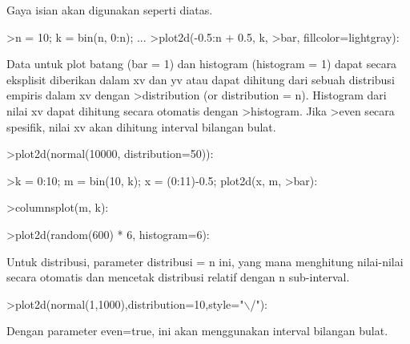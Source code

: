 \documentclass[a4paper,10pt]{article}
\begin{document}
\begin{eulernotebook}
\begin{eulercomment}
\begin{eulercomment}
\begin{eulercomment}
\begin{eulercomment}
\begin{eulercomment}
Gaya isian akan digunakan seperti diatas.
\end{eulercomment}
\begin{eulerprompt}
>n = 10; k = bin(n, 0:n); ...
>plot2d(-0.5:n + 0.5, k, >bar, fillcolor=lightgray):
\end{eulerprompt}
\begin{eulercomment}
Data untuk plot batang (bar = 1) dan histogram (histogram = 1) dapat
secara eksplisit diberikan dalam xv dan yv atau dapat dihitung dari
sebuah distribusi empiris dalam xv dengan \textgreater{}distribution (or
distribution = n). Histogram dari nilai xv dapat dihitung secara
otomatis dengan \textgreater{}histogram. Jika \textgreater{}even secara spesifik, nilai xv akan
dihitung interval bilangan bulat.
\end{eulercomment}
\begin{eulerprompt}
>plot2d(normal(10000, distribution=50)):
\end{eulerprompt}
\begin{eulerprompt}
>k = 0:10; m = bin(10, k); x = (0:11)-0.5; plot2d(x, m, >bar):
\end{eulerprompt}
\begin{eulerprompt}
>columnsplot(m, k):
\end{eulerprompt}
\begin{eulerprompt}
>plot2d(random(600) * 6, histogram=6):
\end{eulerprompt}
\begin{eulercomment}
Untuk distribusi, parameter distribusi = n ini, yang mana menghitung
nilai-nilai secara otomatis dan mencetak distribusi relatif dengan n
sub-interval.
\end{eulercomment}
\begin{eulerprompt}
>plot2d(normal(1,1000),distribution=10,style="\(\backslash\)/"):
\end{eulerprompt}
\begin{eulercomment}
Dengan parameter even=true, ini akan menggunakan interval bilangan
bulat.
\end{eulercomment}
\begin{eulerprompt}

\end{eulerprompt}
\end{eulercomment}
\end{eulercomment}
\end{eulercomment}
\end{eulercomment}
\end{eulernotebook}
\end{document}
